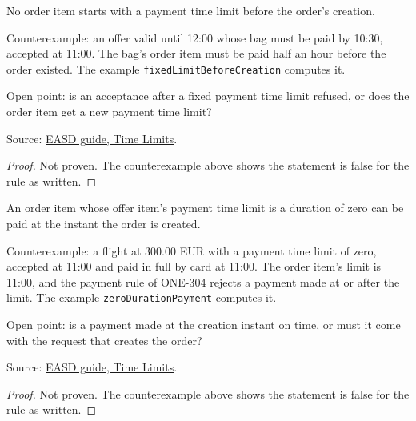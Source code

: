 \begin{theorem}
  \label{thm:offers-create-limit-after-creation}
  No order item starts with a payment time limit before the order's
  creation.

  Counterexample: an offer valid until 12:00 whose bag must be paid by
  10:30, accepted at 11:00. The bag's order item must be paid half an hour
  before the order existed. The example \texttt{fixedLimitBeforeCreation}
  computes it.

  Open point: is an acceptance after a fixed payment time limit refused, or
  does the order item get a new payment time limit?

  Source: \href{https://standards.atlassian.net/wiki/spaces/EASD/pages/574423066/Time+Limits}{EASD guide, Time Limits}.
\end{theorem}
\begin{proof}
  Not proven. The counterexample above shows the statement is false for the
  rule as written.
\end{proof}

\begin{theorem}
  \label{thm:offers-zero-duration-payable}
  An order item whose offer item's payment time limit is a duration of zero
  can be paid at the instant the order is created.

  Counterexample: a flight at 300.00 EUR with a payment time limit of zero,
  accepted at 11:00 and paid in full by card at 11:00. The order item's
  limit is 11:00, and the payment rule of ONE-304 rejects a payment made at
  or after the limit. The example \texttt{zeroDurationPayment} computes it.

  Open point: is a payment made at the creation instant on time, or must it
  come with the request that creates the order?

  Source: \href{https://standards.atlassian.net/wiki/spaces/EASD/pages/574423066/Time+Limits}{EASD guide, Time Limits}.
\end{theorem}
\begin{proof}
  Not proven. The counterexample above shows the statement is false for the
  rule as written.
\end{proof}


